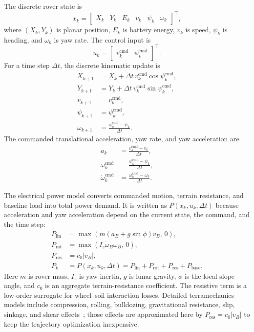 The discrete rover state is
\begin{equation}
    x_k = \begin{bmatrix} X_k & Y_k & E_k & v_k & \psi_k & \omega_k \end{bmatrix}^{\top},
\end{equation}
where $(X_k,Y_k)$ is planar position, $E_k$ is battery energy, $v_k$ is speed, $\psi_k$ is heading, and $\omega_k$ is yaw rate. The control input is
\begin{equation}
    u_k = \begin{bmatrix} v_k^{\mathrm{cmd}} & \psi_k^{\mathrm{cmd}} \end{bmatrix}^{\top}.
\end{equation}
For a time step $\Delta t$, the discrete kinematic update is
\begin{align}
    X_{k+1} &= X_k + \Delta t\, v_k^{\mathrm{cmd}}\cos\psi_k^{\mathrm{cmd}}, \\
    Y_{k+1} &= Y_k + \Delta t\, v_k^{\mathrm{cmd}}\sin\psi_k^{\mathrm{cmd}}, \\
    v_{k+1} &= v_k^{\mathrm{cmd}}, \\
    \psi_{k+1} &= \psi_k^{\mathrm{cmd}}, \\
    \omega_{k+1} &= \frac{\psi_k^{\mathrm{cmd}}-\psi_k}{\Delta t}.
\end{align}
The commanded translational acceleration, yaw rate, and yaw acceleration are
\begin{align}
    a_k &= \frac{v_k^{\mathrm{cmd}}-v_k}{\Delta t}, \\
    \omega_k^{\mathrm{cmd}} &= \frac{\psi_k^{\mathrm{cmd}}-\psi_k}{\Delta t}, \\
    \dot{\omega}_k^{\mathrm{cmd}} &= \frac{\omega_k^{\mathrm{cmd}}-\omega_k}{\Delta t}.
\end{align}

The electrical power model converts commanded motion, terrain resistance, and baseline load into total power demand. It is written as $P(x_k,u_k,\Delta t)$ because acceleration and yaw acceleration depend on the current state, the command, and the time step:
\begin{align}
    P_{\mathrm{lin}} &= \max\!\left(m\left(a_B + g\sin\phi\right)v_B,\,0\right), \\
    P_{\mathrm{rot}} &= \max\!\left(I_z \dot{\omega}_B \omega_B,\,0\right), \\
    P_{\mathrm{res}} &= c_0 |v_B|, \\
    P_k &= P(x_k,u_k,\Delta t)
        = P_{\mathrm{lin}} + P_{\mathrm{rot}} + P_{\mathrm{res}} + P_{\mathrm{base}}.
\end{align}
Here $m$ is rover mass, $I_z$ is yaw inertia, $g$ is lunar gravity, $\phi$ is the local slope angle, and $c_0$ is an aggregate terrain-resistance coefficient. The resistive term is a low-order surrogate for wheel--soil interaction losses. Detailed terramechanics models include compression, rolling, bulldozing, gravitational resistance, slip, sinkage, and shear effects~\cite{li2022terramechanics}; those effects are approximated here by $P_{\mathrm{res}}=c_0|v_B|$ to keep the trajectory optimization inexpensive.

